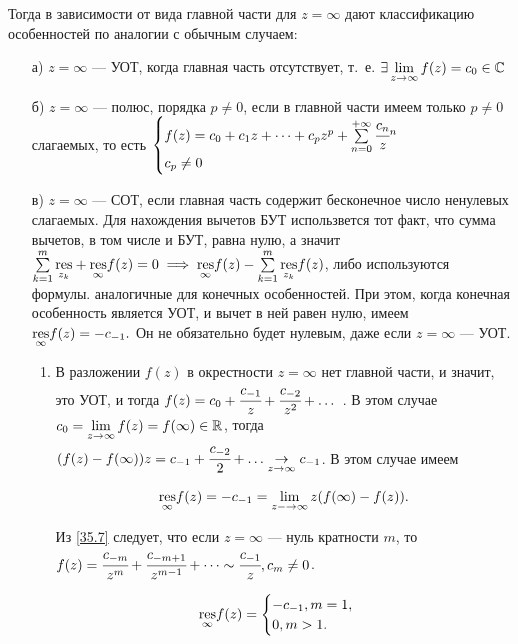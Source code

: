 \documentclass[../../main.tex]{subfiles}
\begin{document}
	 Тогда в зависимости от вида главной части для $z=\infty$ дают классификацию 
	 особенностей по аналогии с обычным случаем:
	 \begin{itemize}
	 	\item[а)] $z=\infty$ --- УОТ, когда главная часть отсутствует, т.~е.
	 	$\exists\lim\limits_{z\rightarrow \infty} f(z)=c_0\in \mathbb{C}$
	 	\item[б)] $z=\infty$ --- полюс, порядка $p\neq 0$, если в 
	 	главной части имеем только $p\neq 0$ слагаемых, то есть 
	 	$
	 	\begin{cases}
	 	f(z)=c_0+c_1z+\dots+c_pz^p+\sum\limits_{n=0}^{+\infty}\cfrac{c_n}
	 	z^n\\
	c_p\neq 0
	 	\end{cases}
	 	$ 
	 \item[в)] $z=\infty$ --- СОТ, если главная часть содержит бесконечное число 
	 ненулевых слагаемых. Для нахождения вычетов БУТ использвется тот факт, что 
	 сумма вычетов, в том числе и БУТ, равна нулю, а значит 
	 $\sum\limits_{k=1}^m\underset{z_k}{\operatorname{res}}+\underset{\infty}{\operatorname{res}}f(z)=0 
	 \implies\underset{\infty}{\operatorname{res}}f(z)-\sum\limits_{k=1}^m 
	 \underset{z_k}{\operatorname{res}}f(z)$, либо используются формулы. аналогичные для 
	 конечных особенностей. При этом, когда конечная особенность является УОТ, и 
	 вычет в ней равен нулю, имеем 	$\underset{\infty}{\operatorname{res}}f(z)=-c_{-1}.$ Он не 
	 обязательно будет нулевым, даже если $z=\infty$ --- УОТ.
	 
	 \begin{enumerate}
	 	\item 
		В разложении $f(z)$ в окрестности $z=\infty$ нет главной части, и 
	 	значит, это УОТ, и тогда $f(z)=c_0+\cfrac{c_{-1}}{z}+\cfrac{c_{-2}}{z^2}+ 
	 	\dots$ . В этом случае 
	 	$c_0=\lim\limits_{z\rightarrow \infty}f(z)=f(\infty)\in \mathbb{R}$, тогда 
	 	$(f(z)-f(\infty))z=c_{-1}+\cfrac{c_{-2}}{2}+ 
	 	\dots\underset{z\rightarrow\infty}{\rightarrow}c_{-1}$. В этом случае имеем 
	 	
	 	\begin{equation}\label{35.7}
	 	\underset{\infty}{\operatorname{res}}f(z)=-c_{-1}= 
	 	\lim\limits_{z-\rightarrow\infty}z(f(\infty)-f(z)).
	 	\end{equation}
	 	
	 	Из \eqref{35.7} следует, что если $z=\infty$ --- нуль кратности $m$, то 
	 	$f(z)=\cfrac{c_{-m}}{z^m}+ \cfrac{c_{-m+1}}{z^{m-1}}+\dots\sim 
	 	\cfrac{c_{-1}}{z}, c_m\neq0$.
	 
	 	\[
	 	\underset{\infty}{\operatorname{res}}f(z)=
	 	\begin{cases}
	 		-c_{-1}, m=1,\\
	 		0, m>1.
	 	\end{cases}
	 	\]
	 	

\end{enumerate}
\end{itemize}
\end{document}
